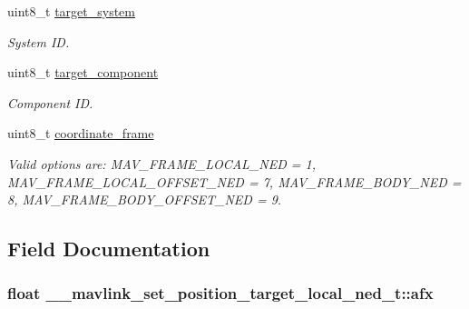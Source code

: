 \begin{DoxyCompactItemize}
uint8\+\_\+t \hyperlink{struct____mavlink__set__position__target__local__ned__t_a66eae6c9fc1ab4184ef2dab7add0404a}{target\+\_\+system}
\begin{DoxyCompactList}\small\item\em System I\+D. \end{DoxyCompactList}\item 
uint8\+\_\+t \hyperlink{struct____mavlink__set__position__target__local__ned__t_a2673d8141ae7ada4e7c458ed6eb5fbfd}{target\+\_\+component}
\begin{DoxyCompactList}\small\item\em Component I\+D. \end{DoxyCompactList}\item 
uint8\+\_\+t \hyperlink{struct____mavlink__set__position__target__local__ned__t_a7a7e0d9ee4e81df555ed8847ded4f317}{coordinate\+\_\+frame}
\begin{DoxyCompactList}\small\item\em Valid options are\+: M\+A\+V\+\_\+\+F\+R\+A\+M\+E\+\_\+\+L\+O\+C\+A\+L\+\_\+\+N\+E\+D = 1, M\+A\+V\+\_\+\+F\+R\+A\+M\+E\+\_\+\+L\+O\+C\+A\+L\+\_\+\+O\+F\+F\+S\+E\+T\+\_\+\+N\+E\+D = 7, M\+A\+V\+\_\+\+F\+R\+A\+M\+E\+\_\+\+B\+O\+D\+Y\+\_\+\+N\+E\+D = 8, M\+A\+V\+\_\+\+F\+R\+A\+M\+E\+\_\+\+B\+O\+D\+Y\+\_\+\+O\+F\+F\+S\+E\+T\+\_\+\+N\+E\+D = 9. \end{DoxyCompactList}\end{DoxyCompactItemize}


\subsection{Field Documentation}
\hypertarget{struct____mavlink__set__position__target__local__ned__t_af5b34145d47ec264f640fdaeaad35a99}{
\subsubsection[{afx}]{\setlength{\rightskip}{0pt plus 5cm}float \+\_\+\+\_\+mavlink\+\_\+set\+\_\+position\+\_\+target\+\_\+local\+\_\+ned\+\_\+t\+::afx}}\label{struct____mavlink__set__position__target__local__ned__t_af5b34145d47ec264f640fdaeaad35a99}


